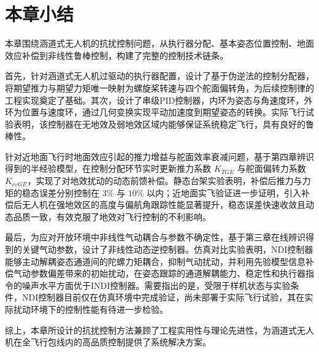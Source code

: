 \section{本章小结}

本章围绕涵道式无人机的抗扰控制问题，从执行器分配、基本姿态位置控制、地面效应补偿到非线性鲁棒控制，构建了完整的控制技术链条。

首先，针对涵道式无人机过驱动的执行器配置，设计了基于伪逆法的控制分配器，将期望推力与期望力矩唯一映射为螺旋桨转速与四个舵面偏转角，为后续控制律的工程实现奠定了基础。其次，设计了串级PID控制器，内环为姿态与角速度环，外环为位置与速度环，通过几何变换实现平动加速度到期望姿态的转换。实际飞行试验表明，该控制器在无地效及弱地效区域内能够保证系统稳定飞行，具有良好的鲁棒性。

针对近地面飞行时地面效应引起的推力增益与舵面效率衰减问题，基于第四章辨识得到的半经验模型，在控制分配环节实时更新推力系数 \(K_{TGE}\) 与舵面偏转力系数 \(K_{cvGE}\)，实现了对地效扰动的动态前馈补偿。静态台架实验表明，补偿后推力与力矩的稳态误差分别控制在 \(3\%\) 与 \(10\%\) 以内；近地面实飞验证进一步证明，引入补偿后无人机在强地效区的高度与偏航角跟踪性能显著提升，稳态误差快速收敛且动态品质一致，有效克服了地效对飞行控制的不利影响。

最后，为应对开放环境中非线性气动耦合与参数不确定性，基于第三章在线辨识得到的关键气动参数，设计了非线性动态逆控制器。仿真对比实验表明，NDI控制器能够主动解耦姿态通道间的陀螺力矩耦合，抑制气动扰动，并利用先验模型信息补偿气动参数偏差带来的初始扰动，在姿态跟踪的通道解耦能力、稳定性和执行器指令的噪声水平方面优于INDI控制器。需要指出的是，受限于样机状态与实验条件，NDI控制器目前仅在仿真环境中完成验证，尚未部署于实际飞行试验，其在实际扰动环境下的控制性能有待进一步检验。

综上，本章所设计的抗扰控制方法兼顾了工程实用性与理论先进性，为涵道式无人机在全飞行包线内的高品质控制提供了系统解决方案。
